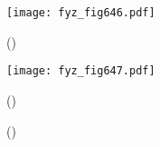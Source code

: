     \begin{figure}[ht!] %
      \centering
      \texttt{[image: fyz\_fig646.pdf]}
      \caption{
               (\cite[s.~707]{Feynman02})}
      \label{fyz:fig646}
    \end{figure}


    \begin{figure}[ht!] %
      \centering
      \texttt{[image: fyz\_fig647.pdf]}
      \caption{
               (\cite[s.~707]{Feynman02})}
      \label{fyz:fig647}
    \end{figure}

    \begin{figure}[ht!]
      \centering
                     \newline
      \label{fyz:fig649}
      \caption{
               (\cite[s.~748]{Feynman02})}
    \end{figure}
    
